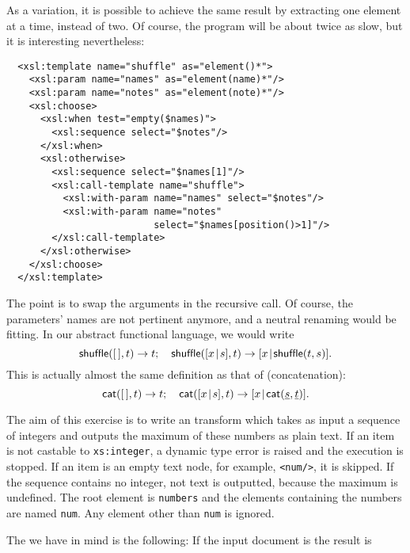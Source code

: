As a variation, it is possible to achieve the same result by
extracting one element at a time, instead of two. Of course, the
program will be about twice as slow, but it is interesting
nevertheless:
\begin{verbatim}
  <xsl:template name="shuffle" as="element()*">
    <xsl:param name="names" as="element(name)*"/>
    <xsl:param name="notes" as="element(note)*"/>
    <xsl:choose>
      <xsl:when test="empty($names)">
        <xsl:sequence select="$notes"/>
      </xsl:when>
      <xsl:otherwise>
        <xsl:sequence select="$names[1]"/>
        <xsl:call-template name="shuffle">
          <xsl:with-param name="names" select="$notes"/>
          <xsl:with-param name="notes"
                          select="$names[position()>1]"/>
        </xsl:call-template>
      </xsl:otherwise>
    </xsl:choose>
  </xsl:template>
\end{verbatim}
The point is to swap the arguments in the recursive call. Of course,
the parameters' names are not pertinent anymore, and a neutral
renaming would be fitting. In our abstract functional language, we
would write
\begin{equation*}
\textsf{shuffle}([\,],t) \rightarrow t;\quad
\textsf{shuffle}([{x}\!\mid\!{s}],t) \rightarrow [{x}\!\mid\!{\textsf{shuffle}(t,s)}].
\end{equation*}
This is actually almost the same definition as that of  (concatenation):
\begin{equation*}
\textsf{cat}([\,],t) \rightarrow t;\quad
\textsf{cat}([{x}\!\mid\!{s}],t) \rightarrow [{x}\!\mid\!{\textsf{cat}(\underline{s},\underline{t})}].
\end{equation*}


The aim of this exercise is to write an \XSLT transform which takes as
input a sequence of integers and outputs the maximum of these numbers
as plain text. If an item is not castable to \texttt{xs:integer}, a
dynamic type error is raised and the execution is stopped. If an item
is an empty text node, for example, \texttt{<num/>}, it is skipped. If
the sequence contains no integer, not text is outputted, because the
maximum is undefined. The root element is \texttt{numbers} and the
elements containing the numbers are named \texttt{num}. Any element
other than \texttt{num} is ignored.

The \DTD we have in mind is the following:
\noindent If the input document is
\noindent the result is

